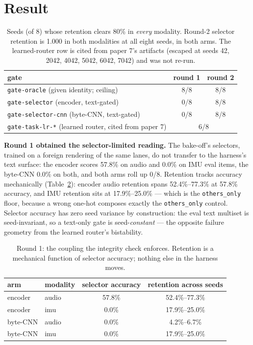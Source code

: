 \documentclass[11pt]{article}
\begin{document}
\section{Result}

\begin{table}[h]
\centering
\begin{tabular}{lcc}
\toprule
gate & round 1 & round 2 \\
\midrule
\texttt{gate-oracle} (given identity; ceiling) & 8/8 & 8/8 \\
\texttt{gate-selector} (encoder, text-gated) & 0/8 & 8/8 \\
\texttt{gate-selector-cnn} (byte-CNN, text-gated) & 0/8 & 8/8 \\
\texttt{gate-task-lr-*} (learned router, cited from paper 7) & \multicolumn{2}{c}{6/8} \\
\bottomrule
\end{tabular}
\caption{Seeds (of 8) whose retention clears 80\% in
\emph{every} modality. Round-2 selector retention is 1.000 in both
modalities at all eight seeds, in both arms. The learned-router row is cited
from paper 7's artifacts (escaped at seeds
42, 2042, 4042, 5042, 6042, 7042) and was not re-run.}
\label{tab:money}
\end{table}

\textbf{Round 1 obtained the selector-limited reading.} The bake-off's
selectors, trained on a foreign rendering of the same lanes, do not transfer
to the harness's text surface: the encoder scores 57.8\% on
audio and 0.0\% on IMU eval items, the byte-CNN 0.0\% on both,
and both arms roll up 0/8. Retention tracks accuracy mechanically
(Table~\ref{tab:coupling}): encoder audio retention spans
52.4\%--77.3\% at 57.8\% accuracy, and IMU
retention sits at 17.9\%--25.0\% --- which is the
\texttt{others\_only} floor, because a wrong one-hot composes exactly the
\texttt{others\_only} control. Selector accuracy has zero seed variance by
construction: the eval text multiset is seed-invariant, so a text-only gate
is seed-\emph{constant} --- the opposite failure geometry from the learned
router's bistability.

\begin{table}[h]
\centering
\begin{tabular}{llcc}
\toprule
arm & modality & selector accuracy & retention across seeds \\
\midrule
encoder & audio & 57.8\% & 52.4\%--77.3\% \\
encoder & imu & 0.0\% & 17.9\%--25.0\% \\
byte-CNN & audio & 0.0\% & 4.2\%--6.7\% \\
byte-CNN & imu & 0.0\% & 17.9\%--25.0\% \\
\bottomrule
\end{tabular}
\caption{Round 1: the coupling the integrity check enforces. Retention is a
mechanical function of selector accuracy; nothing else in the harness moves.}
\label{tab:coupling}
\end{table}
\end{document}
